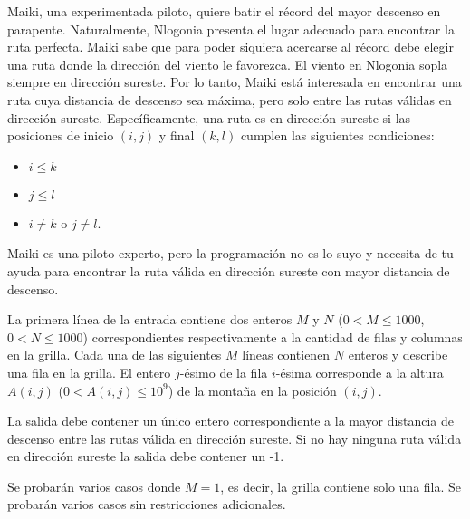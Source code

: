\documentclass{oci}
\begin{document}
\begin{problemDescription}
Maiki, una experimentada piloto, quiere batir el récord del mayor descenso en parapente.
Naturalmente, Nlogonia presenta el lugar adecuado para encontrar la ruta perfecta.
Maiki sabe que para poder siquiera acercarse al récord debe elegir una ruta donde la dirección
del viento le favorezca.
El viento en Nlogonia sopla siempre en dirección sureste.
Por lo tanto, Maiki está interesada en encontrar una ruta cuya distancia de descenso sea máxima,
pero solo entre las rutas válidas en dirección sureste.
Específicamente, una ruta es en dirección sureste si las posiciones de inicio $(i, j)$ y final $(k, l)$
cumplen las siguientes condiciones:
\begin{itemize}
\item $i \le k$
\item $j \le l$
\item $i \ne k$ o $j \ne l$.
\end{itemize}

Maiki es una piloto experto, pero la programación no es lo suyo y necesita de tu ayuda para
encontrar la ruta válida en dirección sureste con mayor distancia de descenso.

\end{problemDescription}

\begin{inputDescription}
La primera línea de la entrada contiene dos enteros $M$ y $N$ ($0 < M \leq 1000$, $0 < N \leq 1000$)
correspondientes respectivamente a la cantidad de filas y columnas en la grilla.
Cada una de las siguientes $M$ líneas contienen $N$ enteros y describe una fila en la grilla.
El entero $j$-ésimo de la fila $i$-ésima corresponde a la altura $A(i,j)$ ($ 0 < A(i, j) \leq 10^9$)
de la montaña en la posición $(i,j)$.
\end{inputDescription}

\begin{outputDescription}
La salida debe contener un único entero correspondiente a la mayor distancia de descenso entre las
rutas válida en dirección sureste.
Si no hay ninguna ruta válida en dirección sureste la salida debe contener un -1.
\end{outputDescription}

\begin{scoreDescription}
  Se probarán varios casos donde $M=1$, es decir, la grilla contiene solo una fila.
  Se probarán varios casos sin restricciones adicionales.
\end{scoreDescription}

\begin{sampleDescription}
\end{sampleDescription}
\end{document}
